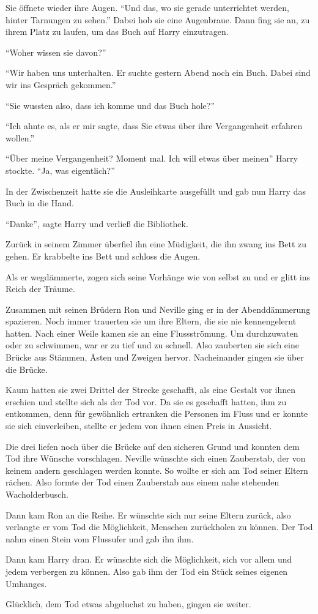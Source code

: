 Sie öffnete wieder ihre Augen. \enquote{Und das, wo sie gerade unterrichtet werden, hinter Tarnungen zu sehen.} Dabei hob sie eine Augenbraue. Dann fing sie an, zu ihrem Platz zu laufen, um das Buch auf Harry einzutragen.

\enquote{Woher wissen sie davon?}

\enquote{Wir haben uns unterhalten. Er suchte gestern Abend noch ein Buch. Dabei sind wir ins Gespräch gekommen.}

\enquote{Sie wussten also, dass ich komme und das Buch hole?}

\enquote{Ich ahnte es, als er mir sagte, dass Sie etwas über ihre Vergangenheit erfahren wollen.}

\enquote{Über meine Vergangenheit? Moment mal. Ich will etwas über meinen\abs} Harry stockte. \enquote{Ja, was eigentlich?}

In der Zwischenzeit hatte sie die Ausleihkarte ausgefüllt und gab nun Harry das Buch in die Hand.

\enquote{Danke}, sagte Harry und verließ die Bibliothek.

Zurück in seinem Zimmer überfiel ihn eine Müdigkeit, die ihn zwang ins Bett zu gehen.  Er krabbelte ins Bett und schloss die Augen.

Als er wegdämmerte, zogen sich seine Vorhänge wie von selbst zu und er glitt ins Reich der Träume.

\begin{traum}
Zusammen mit seinen Brüdern Ron und Neville ging er in der Abenddämmerung spazieren. Noch immer trauerten sie um ihre Eltern, die sie nie kennengelernt hatten. Nach einer Weile kamen sie an eine Flussströmung. Um durchzuwaten oder zu schwimmen, war er zu tief und zu schnell. Also zauberten sie sich eine Brücke aus Stämmen, Ästen und Zweigen hervor. Nacheinander gingen sie über die Brücke.

Kaum hatten sie zwei Drittel der Strecke geschafft, als eine Gestalt vor ihnen erschien und stellte sich als der Tod vor. Da sie es geschafft hatten, ihm zu entkommen, denn für gewöhnlich ertranken die Personen im Fluss und er konnte sie sich einverleiben, stellte er jedem von ihnen einen Preis in Aussicht.

Die drei liefen noch über die Brücke auf den sicheren Grund und konnten dem Tod ihre Wünsche vorschlagen. Neville wünschte sich einen Zauberstab, der von keinem andern geschlagen werden konnte. So wollte er sich am Tod seiner Eltern rächen. Also formte der Tod einen Zauberstab aus einem nahe stehenden Wacholderbusch.

Dann kam Ron an die Reihe. Er wünschte sich nur seine Eltern zurück, also verlangte er vom Tod die Möglichkeit, Menschen zurückholen zu können. Der Tod nahm einen Stein vom Flussufer und gab ihn ihm.

Dann kam Harry dran. Er wünschte sich die Möglichkeit, sich vor allem und jedem verbergen zu können. Also gab ihm der Tod ein Stück seines eigenen Umhanges.

Glücklich, dem Tod etwas abgeluchst zu haben, gingen sie weiter.
\end{traum}

